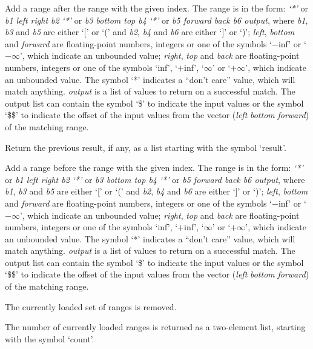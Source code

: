   Add a range after the range with the given index.
  The range is in the form: \emph{`*'} or \emph{b1 left right b2} \emph{`*'} or \emph{b3 bottom top b4} \emph{`*'} or \emph{b5 forward back b6 output}, where
  \emph{b1}, \emph{b3} and \emph{b5} are either `[' or `(' and \emph{b2}, \emph{b4} and \emph{b6} are
  either `]' or `)';
  \emph{left}, \emph{bottom} and \emph{forward} are floating-point numbers, integers or one of the symbols `$-$inf' or
  `$-\infty$', which indicate an unbounded value;
  \emph{right}, \emph{top} and \emph{back} are floating-point numbers, integers or one of the symbols `inf', `$+$inf',
  `$\infty$' or `$+\infty$', which indicate an unbounded value.
  The symbol `*' indicates a ``don't care'' value, which will match anything.
  \emph{output} is a list of values to return on a successful match.
  The output list can contain the symbol `\$' to indicate the input values or the symbol `\$\$' to
  indicate the offset of the input values from the vector (\emph{left} \emph{bottom} \emph{forward}) of the
  matching range.

  Return the previous result, if any, as a list starting with the symbol `result'.

  Add a range before the range with the given index.
  The range is in the form: \emph{`*'} or \emph{b1 left right b2} \emph{`*'} or \emph{b3 bottom top b4} \emph{`*'} or \emph{b5 forward back b6 output}, where
  \emph{b1}, \emph{b3} and \emph{b5} are either `[' or `(' and \emph{b2}, \emph{b4} and \emph{b6} are
  either `]' or `)';
  \emph{left}, \emph{bottom} and \emph{forward} are floating-point numbers, integers or one of the symbols `$-$inf' or
  `$-\infty$', which indicate an unbounded value;
  \emph{right}, \emph{top} and \emph{back} are floating-point numbers, integers or one of the symbols `inf', `$+$inf',
  `$\infty$' or `$+\infty$', which indicate an unbounded value.
  The symbol `*' indicates a ``don't care'' value, which will match anything.
  \emph{output} is a list of values to return on a successful match.
  The output list can contain the symbol `\$' to indicate the input values or the symbol `\$\$' to
  indicate the offset of the input values from the vector (\emph{left} \emph{bottom} \emph{forward}) of the
  matching range.

  The currently loaded set of ranges is removed.
  
  The number of currently loaded ranges is returned as a two-element list, starting with the symbol
  `count'.
  
